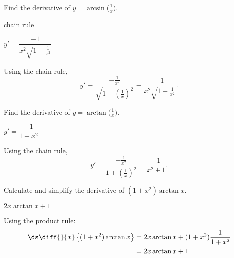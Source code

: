 \begin{question}[1997A]
Find the derivative of  $y=\arcsin \!\big(\frac{1}{x}\big)$.
\end{question}
\begin{hint} chain rule
\end{hint}
\begin{answer} $y'=\dfrac{-1}{x^2\sqrt{1-\frac{1}{x^2}}}$
\end{answer}
\begin{solution} Using the chain rule, \[y'=\frac{-{\frac{1}{ x^2}}}{\sqrt{1-\left({\frac{1}{ x}}\right)^2}}=\frac{-1}{x^2\sqrt{1-\frac{1}{x^2}}}.\]
\end{solution}



\begin{question}[1996D]
Find the derivative of $y=\arctan \big(\frac{1}{x}\big)$.
\end{question}
\begin{answer} $y'=\dfrac{-1}{1+x^2}$
\end{answer}
\begin{solution} Using the chain rule,
\[y'=\frac{-{\frac{1}{ x^2}}}{1+\left({\frac{1}{ x}}\right)^2}=\frac{-1}{x^2+1}.\]
\end{solution}


\begin{question}[1999H]
Calculate and simplify the derivative of
$(1+x^2)\arctan x$.
\end{question}
\begin{answer} $2x\arctan x+1$
\end{answer}
\begin{solution}
Using the product rule:
\begin{align*}
\ds\diff{}{x}\left\{(1+x^2)\arctan x\right\}
&=2x\arctan x+(1+x^2)\frac{1}{1+x^2}\\
&=2x\arctan x+1\end{align*}
\end{solution}



